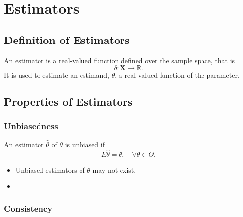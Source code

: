 \section{Estimators}

\subsection{Definition of Estimators}

\begin{definition}[Estimator] \label{def:estimator}
    An estimator is a real-valued function defined over the sample space, that is
    \begin{equation}
        \delta:\textbf{X}\rightarrow\mathbb{R}.
    \end{equation}
    It is used to estimate an estimand, $\theta$, a real-valued function of the parameter.
\end{definition}

\subsection{Properties of Estimators}

\subsubsection*{Unbiasedness}

\begin{definition}[Unbiasedness]
    An estimator $\hat{\theta}$ of $\theta$ is unbiased if
    \begin{equation}
        E\hat{\theta}=\theta,\quad\forall\theta\in\Theta.
    \end{equation}
\end{definition}

\begin{note}
    \begin{itemize}
        \item Unbiased estimators of $\theta$ may not exist.
        \item
    \end{itemize}
\end{note}

\begin{example}

\end{example}

\subsubsection*{Consistency}

